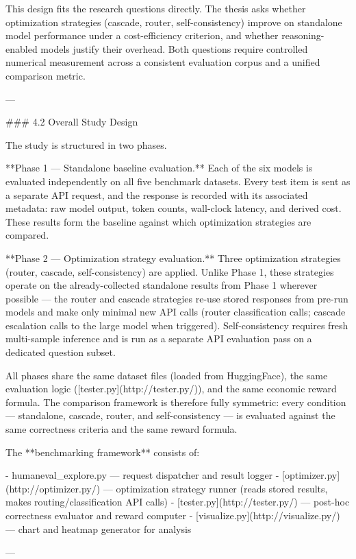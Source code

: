 This design fits the research questions directly. The thesis asks whether optimization strategies (cascade, router, self-consistency) improve on standalone model performance under a cost-efficiency criterion, and whether reasoning-enabled models justify their overhead. Both questions require controlled numerical measurement across a consistent evaluation corpus and a unified comparison metric.

---

### 4.2 Overall Study Design

The study is structured in two phases.

**Phase 1 — Standalone baseline evaluation.** Each of the six models is evaluated independently on all five benchmark datasets. Every test item is sent as a separate API request, and the response is recorded with its associated metadata: raw model output, token counts, wall-clock latency, and derived cost. These results form the baseline against which optimization strategies are compared.

**Phase 2 — Optimization strategy evaluation.** Three optimization strategies (router, cascade, self-consistency) are applied. Unlike Phase 1, these strategies operate on the already-collected standalone results from Phase 1 wherever possible — the router and cascade strategies re-use stored responses from pre-run models and make only minimal new API calls (router classification calls; cascade escalation calls to the large model when triggered). Self-consistency requires fresh multi-sample inference and is run as a separate API evaluation pass on a dedicated question subset.

All phases share the same dataset files (loaded from HuggingFace), the same evaluation logic ([tester.py](http://tester.py/)), and the same economic reward formula. The comparison framework is therefore fully symmetric: every condition — standalone, cascade, router, and self-consistency — is evaluated against the same correctness criteria and the same reward formula.

The **benchmarking framework** consists of:

- humaneval_explore.py — request dispatcher and result logger
- [optimizer.py](http://optimizer.py/) — optimization strategy runner (reads stored results, makes routing/classification API calls)
- [tester.py](http://tester.py/) — post-hoc correctness evaluator and reward computer
- [visualize.py](http://visualize.py/) — chart and heatmap generator for analysis

---

